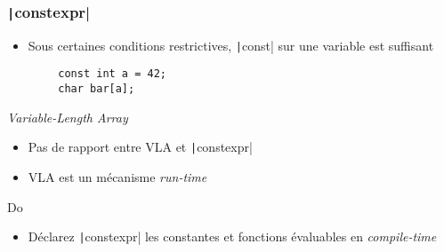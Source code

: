 \documentclass[C++.tex]{subfiles}
\begin{document}
\begin{frame}[fragile]
	\frametitle{\texttt|constexpr|}
	\begin{itemize}
		\item Sous certaines conditions restrictives, \texttt|const| sur une variable est suffisant

	\end{itemize}

	\begin{verbatim}
		const int a = 42;
		char bar[a];
	\end{verbatim}

	\begin{alertblock}{\textit{Variable-Length Array}}
		\begin{itemize}
			\item Pas de rapport entre VLA et \texttt|constexpr|
			\item VLA est un mécanisme \textit{run-time}
		\end{itemize}
	\end{alertblock}


	\begin{exampleblock}{Do}
		\begin{itemize}
			\item Déclarez \texttt|constexpr| les constantes et fonctions évaluables en \textit{compile-time}
		\end{itemize}
	\end{exampleblock}
\end{frame}
\end{document}
